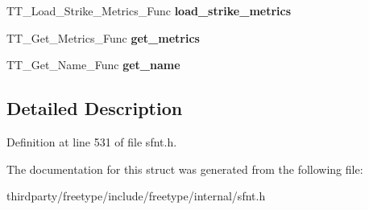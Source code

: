 \begin{DoxyCompactItemize}
\mbox{\label{struct_s_f_n_t___interface___a285149d0d4f00f2b862e3db45205cfa0}} 
T\+T\+\_\+\+Load\+\_\+\+Strike\+\_\+\+Metrics\+\_\+\+Func {\bfseries load\+\_\+strike\+\_\+metrics}
\item 
\mbox{\label{struct_s_f_n_t___interface___a32ceff5842782c1cf7d7992e40cc858e}} 
T\+T\+\_\+\+Get\+\_\+\+Metrics\+\_\+\+Func {\bfseries get\+\_\+metrics}
\item 
\mbox{\label{struct_s_f_n_t___interface___aebd27b200f47621f290e21a8cd63b8dc}} 
T\+T\+\_\+\+Get\+\_\+\+Name\+\_\+\+Func {\bfseries get\+\_\+name}
\end{DoxyCompactItemize}


\subsection{Detailed Description}


Definition at line 531 of file sfnt.\+h.



The documentation for this struct was generated from the following file\+:\begin{DoxyCompactItemize}
\item 
thirdparty/freetype/include/freetype/internal/sfnt.\+h\end{DoxyCompactItemize}

